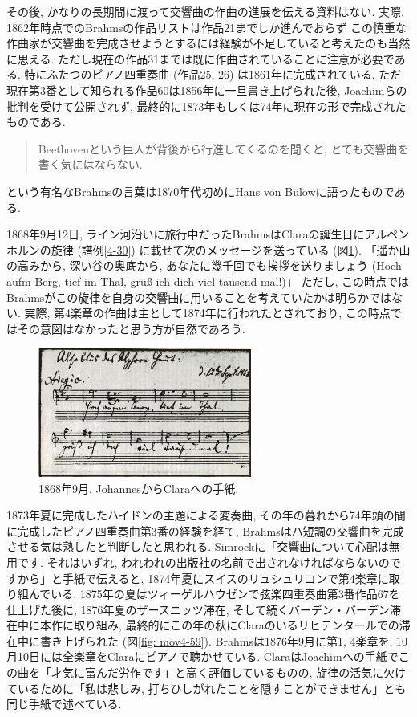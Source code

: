 その後, かなりの長期間に渡って交響曲の作曲の進展を伝える資料はない.
実際, 1862年時点でのBrahmsの作品リストは作品21までしか進んでおらず
この慎重な作曲家が交響曲を完成させようとするには経験が不足していると考えたのも当然に思える.
ただし現在の作品31までは既に作曲されていることに注意が必要である. 特にふたつのピアノ四重奏曲 (作品25, 26) は1861年に完成されている.
ただ現在第3番として知られる作品60は1856年に一旦書き上げられた後, Joachimらの批判を受けて公開されず, 最終的に1873年もしくは74年に現在の形で完成されたものである.
\begin{quote}
	Beethovenという巨人が背後から行進してくるのを聞くと, とても交響曲を書く気にはならない.\cite{denki}
\end{quote}
という有名なBrahmsの言葉は1870年代初めにHans von Bülowに語ったものである\cite{library}.

1868年9月12日, ライン河沿いに旅行中だったBrahms\cite{compos}はClaraの誕生日にアルペンホルンの旋律 (譜例\ref{4-30}) に載せて次のメッセージを送っている (図\ref{fig: alphorn}).
「遥か山の高みから, 深い谷の奥底から, あなたに幾千回でも挨拶を送りましょう (Hoch aufm Berg, tief im Thal, grüß ich dich viel tausend mal!)」
ただし, この時点ではBrahmsがこの旋律を自身の交響曲に用いることを考えていたかは明らかではない.
実際, 第4楽章の作曲は主として1874年に行われたとされており, この時点ではその意図はなかったと思う方が自然であろう\cite{frisch}.

\begin{figure}[htbp]
	\begin{center}
    \includegraphics[clip,width=7.0cm]{./figure/alphorn.jpg}
	\caption{1868年9月, JohannesからClaraへの手紙.}
    \label{fig: alphorn}
	\end{center}
\end{figure}

1873年夏に完成したハイドンの主題による変奏曲, その年の暮れから74年頭の間に完成したピアノ四重奏曲第3番の経験を経て, Brahmsはハ短調の交響曲を完成させる気は熟したと判断したと思われる.
Simrockに「交響曲について心配は無用です. それはいずれ, われわれの出版社の名前で出されなければならないのですから」と手紙で伝える\cite{ogt}と,
1874年夏にスイスのリュシュリコンで第4楽章に取り組んでいる.
1875年の夏はツィーゲルハウゼンで弦楽四重奏曲第3番作品67を仕上げた\cite{compos}後に, 1876年夏のザースニッツ滞在,
そして続くバーデン・バーデン滞在中に本作に取り組み, 最終的にこの年の秋にClaraのいるリヒテンタールでの滞在中に書き上げられた (図\ref{fig: mov4-59}).
Brahmsは1876年9月に第1, 4楽章を, 10月10日には全楽章をClaraにピアノで聴かせている.
ClaraはJoachimへの手紙でこの曲を「才気に富んだ労作です」と高く評価しているものの, 旋律の活気に欠けているために「私は悲しみ,
打ちひしがれたことを隠すことができません」とも同じ手紙で述べている\cite{compos}.


